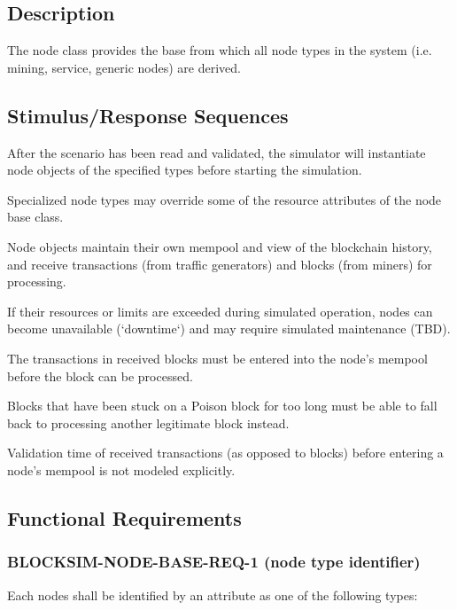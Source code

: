 \documentclass{scrreprt}
\begin{document}
    \subsection{Description}

      The node class provides the base from which all node types in the
      system (i.e. mining, service, generic nodes) are derived.

    \subsection{Stimulus/Response Sequences}

      After the scenario has been read and validated, the simulator will
      instantiate node objects of the specified types before starting the
      simulation.

      Specialized node types may override some of the resource attributes
      of the node base class.

      Node objects maintain their own mempool and view of the blockchain
      history, and receive transactions (from traffic generators) and blocks
      (from miners) for processing.

      If their resources or limits are exceeded during simulated operation,
      nodes can become unavailable (`downtime`) and may require simulated
      maintenance (TBD).

      The transactions in received blocks must be entered into the node's
      mempool before the block can be processed.

      Blocks that have been stuck on a Poison block for too long must be able
      to fall back to processing another legitimate block instead.

      Validation time of received transactions (as opposed to blocks) before
      entering a node's mempool is not modeled explicitly.

    \subsection{Functional Requirements}

      \subsubsection{BLOCKSIM-NODE-BASE-REQ-1 (node type identifier)}

        Each nodes shall be identified by an attribute as one of the following
        types:
\end{document}
